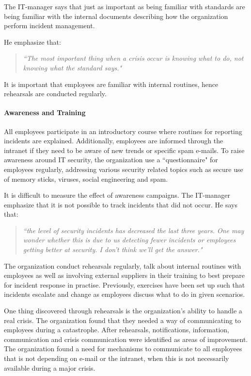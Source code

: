 The IT-manager says that just as important as being familiar with standards are being familiar with the internal documents describing how the organization perform incident management. 

He emphasize that:
\begin{quote}
\textit{``The most important thing when a crisis occur is knowing what to do, not knowing what the standard says."}
\end{quote}
It is important that employees are familiar with internal routines, hence rehearsals are conducted regularly.

\paragraph{Awareness and Training}
All employees participate in an introductory course where routines for reporting incidents are explained. Additionally, employees are informed through the intranet if they need to be aware of new trends or specific spam e-mails. To raise awareness around IT security, the organization use a ``questionnaire" for employees regularly, addressing various security related topics such as secure use of memory sticks, viruses, social engineering and spam. 

It is difficult to measure the effect of awareness campaigns. The IT-manager emphasize that it is not possible to track incidents that did not occur. He says that:
\begin{quote}
\textit{``the level of security incidents has decreased the last three years. One may wonder whether this is due to us detecting fewer incidents or employees getting better at security. I don't think we'll get the answer."}
\end{quote}
 
The organization conduct rehearsals regularly, talk about internal routines with employees as well as involving external suppliers in their training to best prepare for incident response in practise. Previously, exercises have been set up such that incidents escalate and change as employees discuss what to do in given scenarios.

One thing discovered through rehearsals is the organization's ability to handle a real crisis. The organization found that they needed a way of communicating to employees during a catastrophe. After rehearsals, notifications, information, communication and crisis communication were identified as areas of improvement. The organization found a need for mechanisms to communicate to all employees that is not depending on e-mail or the intranet, when this is not necessarily available during a major crisis.

